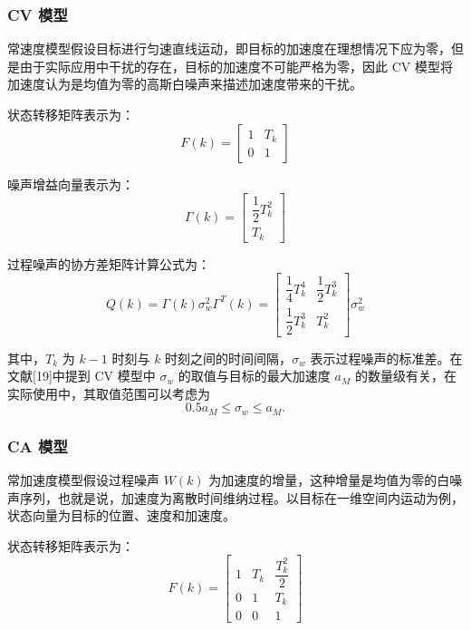 \documentclass{xdupgthesis}
\begin{document}
\subsubsection{CV 模型}

常速度模型假设目标进行匀速直线运动，即目标的加速度在理想情况下应为零，但是由于实际应用中干扰的存在，目标的加速度不可能严格为零，因此 CV 模型将加速度认为是均值为零的高斯白噪声来描述加速度带来的干扰。

状态转移矩阵表示为：
\begin{equation}
	F(k)=
	\begin{bmatrix}
		1 & T_k\\
		0 & 1
	\end{bmatrix}
	\tag{2-15}
\end{equation}

噪声增益向量表示为：
\begin{equation}
	\Gamma(k)=
	\begin{bmatrix}
		\dfrac{1}{2}T_k^2\\
		T_k
	\end{bmatrix}
	\tag{2-16}
\end{equation}

过程噪声的协方差矩阵计算公式为：
\begin{equation}
	Q(k)=\Gamma(k)\sigma_w^2\Gamma^{T}(k)=
	\begin{bmatrix}
		\dfrac{1}{4}T_k^4 & \dfrac{1}{2}T_k^3\\[6pt]
		\dfrac{1}{2}T_k^3 & T_k^2
	\end{bmatrix}\sigma_w^2
	\tag{2-17}
\end{equation}

其中，$T_k$ 为 $k-1$ 时刻与 $k$ 时刻之间的时间间隔，$\sigma_w$ 表示过程噪声的标准差。在文献[19]中提到 CV 模型中 $\sigma_w$ 的取值与目标的最大加速度 $a_M$ 的数量级有关，在实际使用中，其取值范围可以考虑为
\[
0.5a_M \leq \sigma_w \leq a_M.
\]

\subsubsection{CA 模型}

常加速度模型假设过程噪声 $W(k)$ 为加速度的增量，这种增量是均值为零的白噪声序列，也就是说，加速度为离散时间维纳过程。以目标在一维空间内运动为例，状态向量为目标的位置、速度和加速度。

状态转移矩阵表示为：
\begin{equation}
	F(k)=
	\begin{bmatrix}
		1 & T_k & \dfrac{T_k^2}{2}\\
		0 & 1   & T_k\\
		0 & 0   & 1
	\end{bmatrix}
	\tag{2-18}
\end{equation}
\end{document}
